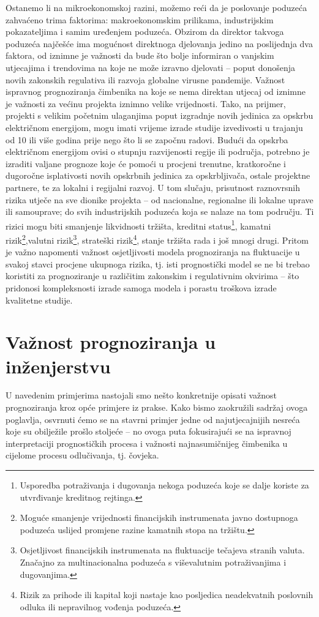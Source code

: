 \documentclass[a4paper,12pt,oneside]{memoir}
\begin{document}
        Ostanemo li na mikroekonomskoj razini, možemo reći da je poslovanje poduzeća zahvaćeno trima faktorima: makroekonomskim prilikama, industrijskim pokazateljima i samim uređenjem poduzeća. Obzirom da direktor takvoga poduzeća najčešće ima mogućnost direktnoga djelovanja jedino na poslijednja dva faktora, od iznimne je važnosti da bude što bolje informiran o vanjskim utjecajima i trendovima na koje ne može izravno djelovati -- poput donošenja novih zakonskih regulativa ili razvoja globalne virusne pandemije. Važnost ispravnog prognoziranja čimbenika na koje se nema direktan utjecaj od iznimne je važnosti za većinu projekta iznimno velike vrijednosti. Tako, na prijmer, projekti s velikim početnim ulaganjima poput izgradnje novih jedinica za opskrbu električnom energijom, mogu imati vrijeme izrade studije izvedivosti u trajanju od 10 ili više godina prije nego što li se započnu radovi. Budući da opskrba električnom energijom ovisi o stupnju razvijenosti regije ili područja, potrebno je izraditi valjane prognoze koje će pomoći u procjeni trenutne, kratkoročne i dugoročne isplativosti novih opskrbnih jedinica za opskrbljivača, ostale projektne partnere, te za lokalni i regijalni razvoj. U tom slučaju, prisutnost raznovrsnih rizika utječe na sve dionike projekta -- od nacionalne, regionalne ili lokalne uprave ili samouprave; do svih industrijskih poduzeća koja se nalaze na tom području. Ti rizici mogu biti smanjenje likvidnosti tržišta, kreditni status\footnote{Usporedba potraživanja i dugovanja nekoga poduzeća koje se dalje koriste za utvrđivanje kreditnog rejtinga.}, kamatni rizik\footnote{Moguće smanjenje vrijednosti financijskih instrumenata javno dostupnoga poduzeća uslijed promjene razine kamatnih stopa na tržištu.},valutni rizik\footnote{Osjetljivost financijskih instrumenata na fluktuacije tečajeva stranih valuta. Značajno za multinacionalna poduzeća s viševalutnim potraživanjima i dugovanjima.}, strateški rizik\footnote{Rizik za prihode ili kapital koji nastaje kao posljedica neadekvatnih poslovnih odluka ili nepravilnog vođenja poduzeća.}, stanje tržišta rada i još mnogi drugi. Pritom je važno napomenti važnost osjetljivosti modela prognoziranja na fluktuacije u svakoj stavci procjene ukupnoga rizika, tj. isti prognostički model se ne bi trebao koristiti za prognoziranje u različitim zakonskim i regulativnim okvirima -- što pridonosi kompleksnosti izrade samoga modela i porastu troškova izrade kvalitetne studije.

        \section{Važnost prognoziranja u inženjerstvu}
            U navedenim primjerima nastojali smo nešto konkretnije opisati važnost prognoziranja kroz opće primjere iz prakse. Kako bismo zaokružili sadržaj ovoga poglavlja, osvrnuti ćemo se na stavrni primjer jedne od najutjecajnijih nesreća koje su obilježile prošlo stoljeće --  no ovoga puta fokusirajući se na ispravnoj interpretaciji prognostičkih procesa i važnosti najnasumičnijeg čimbenika u cijelome procesu odlučivanja, tj. čovjeka.
\end{document}
